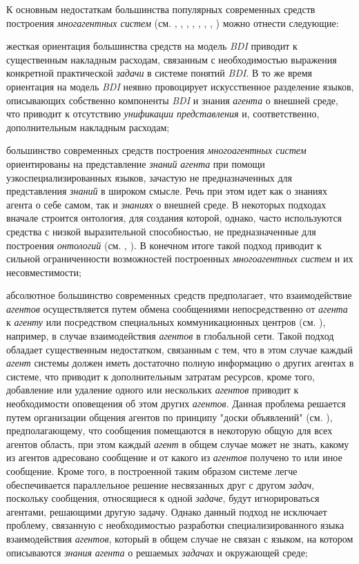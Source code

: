 К основным недостаткам большинства популярных современных средств построения \textit{многагентных систем} (см. , , , ,	, , , ) можно отнести следующие:
\begin{textitemize}
\item жесткая ориентация большинства средств на модель \textit{BDI} приводит к существенным накладным расходам, связанным с необходимостью выражения конкретной практической \textit{задачи} в системе понятий \textit{BDI}. В то же время ориентация на модель \textit{BDI} неявно провоцирует искусственное разделение языков, описывающих собственно компоненты \textit{BDI} и знания \textit{агента} о внешней среде, что приводит к отсутствию \textit{унификации представления} и, соответственно, дополнительным накладным расходам;
\item большинство современных средств построения \textit{многоагентных систем} ориентированы на представление \textit{знаний} \textit{агента} при помощи узкоспециализированных языков, зачастую не предназначенных для представления \textit{знаний} в широком смысле. Речь при этом идет как о знаниях агента о себе самом, так и \textit{знаниях} о внешней среде. В некоторых подходах вначале строится онтология, для создания которой, однако, часто используются средства с низкой выразительной способностью, не предназначенные для построения \textit{онтологий} (см. , ). В конечном итоге такой подход приводит к сильной ограниченности возможностей построенных \textit{многоагентных систем} и их несовместимости;
\item абсолютное большинство современных средств предполагает, что взаимодействие \textit{агентов} осуществляется путем обмена сообщениями непосредственно от \textit{агента} к \textit{агенту} или посредством специальных коммуникационных центров (см. ), например, в случае взаимодействия \textit{агентов} в глобальной сети. Такой подход обладает существенным недостатком, связанным с тем, что в этом случае каждый \textit{агент} системы должен иметь достаточно полную информацию о других агентах в системе, что приводит к дополнительным затратам ресурсов, кроме того, добавление или удаление одного или нескольких \textit{агентов} приводит к необходимости оповещения об этом других \textit{агентов}. Данная проблема решается путем организации общения агентов по принципу "доски объявлений"{} (см. ), предполагающему, что сообщения помещаются в некоторую общую для всех агентов область, при этом каждый \textit{агент} в общем случае может не знать, какому из агентов адресовано сообщение и от какого из \textit{агентов} получено то или иное сообщение. Кроме того, в построенной таким образом системе легче обеспечивается параллельное решение несвязанных друг с другом \textit{задач}, поскольку сообщения, относящиеся к одной \textit{задаче}, будут игнорироваться агентами, решающими другую задачу. Однако данный подход не исключает проблему, связанную с необходимостью разработки специализированного языка взаимодействия \textit{агентов}, который в общем случае не связан с языком, на котором описываются \textit{знания} \textit{агента} о решаемых \textit{задачах} и окружающей среде;

\end{textitemize}

